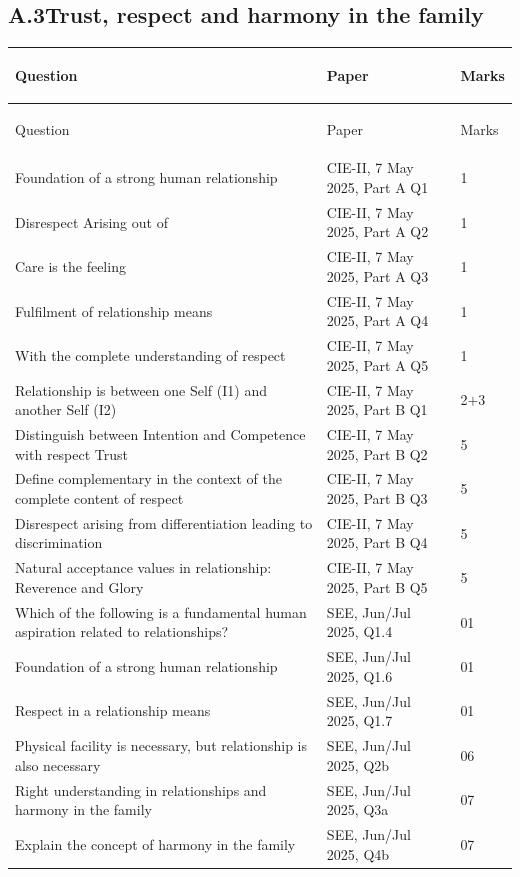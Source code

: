 \documentclass[11pt,a4paper,oneside]{book}
\newcommand{\hdr}[1]{{\sffamily\bfseries\color{white}\strut #1}}
\newenvironment{idxtable}
  {\renewcommand{\arraystretch}{1.3}%
   \arrayrulecolor{rulegrey}%
   \setlength{\LTpre}{6pt}\setlength{\LTpost}{4pt}%
   \begin{longtable}{P{104mm} P{40mm} C{13mm}}
   \rowcolor{slate}
   \hdr{Question} & \hdr{Paper} & \hdr{Marks} \\ \hline \endfirsthead
   \rowcolor{slate}
   \hdr{Question} & \hdr{Paper} & \hdr{Marks} \\ \hline \endhead}
  {\end{longtable}}
\begin{document}
\subsection*{A.3\enspace Trust, respect and harmony in the family}

\begin{idxtable}
Foundation of a strong human relationship &
  CIE-II, 7 May 2025, Part A Q1 & 1 \\ \hline
Disrespect Arising out of & CIE-II, 7 May 2025, Part A Q2 & 1 \\ \hline
Care is the feeling & CIE-II, 7 May 2025, Part A Q3 & 1 \\ \hline
Fulfilment of relationship means & CIE-II, 7 May 2025, Part A Q4 & 1 \\ \hline
With the complete understanding of respect &
  CIE-II, 7 May 2025, Part A Q5 & 1 \\ \hline
Relationship is between one Self (I1) and another Self (I2) &
  CIE-II, 7 May 2025, Part B Q1 & 2$+$3 \\ \hline
Distinguish between Intention and Competence with respect Trust &
  CIE-II, 7 May 2025, Part B Q2 & 5 \\ \hline
Define complementary in the context of the complete content of respect &
  CIE-II, 7 May 2025, Part B Q3 & 5 \\ \hline
Disrespect arising from differentiation leading to discrimination &
  CIE-II, 7 May 2025, Part B Q4 & 5 \\ \hline
Natural acceptance values in relationship: Reverence and Glory &
  CIE-II, 7 May 2025, Part B Q5 & 5 \\ \hline
Which of the following is a fundamental human aspiration related to
  relationships? & SEE, Jun/Jul 2025, Q1.4 & 01 \\ \hline
Foundation of a strong human relationship &
  SEE, Jun/Jul 2025, Q1.6 & 01 \\ \hline
Respect in a relationship means & SEE, Jun/Jul 2025, Q1.7 & 01 \\ \hline
Physical facility is necessary, but relationship is also necessary &
  SEE, Jun/Jul 2025, Q2b & 06 \\ \hline
Right understanding in relationships and harmony in the family &
  SEE, Jun/Jul 2025, Q3a & 07 \\ \hline
Explain the concept of harmony in the family &
  SEE, Jun/Jul 2025, Q4b & 07 \\ \hline
\end{idxtable}
\end{document}
